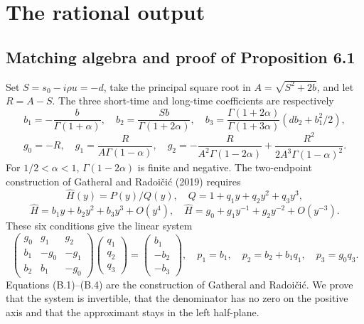 \documentclass[11pt,a4paper]{article}
\begin{document}
\setcounter{section}{1}\section{The rational output}

\setcounter{subsection}{0}\subsection{Matching algebra and proof of Proposition 6.1}

Set \(S=s_0-i\rho u=-d\), take the principal square root in \(A=\sqrt{S^2+2b}\), and let \(R=A-S\). The three short-time and long-time coefficients are respectively
\begin{equation*}\tag{B.1}
b_1=-\frac b{\Gamma(1+\alpha)},\quad
b_2=\frac{Sb}{\Gamma(1+2\alpha)},\quad
b_3=\frac{\Gamma(1+2\alpha)}{\Gamma(1+3\alpha)}
       (d b_2+b_1^2/2),
\end{equation*}
\begin{equation*}\tag{B.2}
g_0=-R,\quad g_1=\frac R{A\Gamma(1-\alpha)},\quad
g_2=-\frac R{A^2\Gamma(1-2\alpha)}
       +\frac{R^2}{2A^3\Gamma(1-\alpha)^2}.
\end{equation*}
For \(1/2<\alpha<1\), \(\Gamma(1-2\alpha)\) is finite and negative. The two-endpoint construction of Gatheral and Radoičić (2019) requires
\[
\widehat H(y)=P(y)/Q(y),\quad
Q=1+q_1y+q_2y^2+q_3y^3,
\]
\begin{equation*}\tag{B.3}
\widehat H=b_1y+b_2y^2+b_3y^3+O(y^4),\quad
\widehat H=g_0+g_1y^{-1}+g_2y^{-2}+O(y^{-3}).
\end{equation*}
These six conditions give the linear system
\begin{equation*}\tag{B.4}
\begin{pmatrix}g_0&g_1&g_2\\b_1&-g_0&-g_1\\
b_2&b_1&-g_0\end{pmatrix}
\begin{pmatrix}q_1\\q_2\\q_3\end{pmatrix}
=\begin{pmatrix}b_1\\-b_2\\-b_3\end{pmatrix},
\quad p_1=b_1,\quad p_2=b_2+b_1q_1,\quad p_3=g_0q_3.
\end{equation*}
Equations (B.1)–(B.4) are the construction of Gatheral and Radoičić. We prove that the system is invertible, that the denominator has no zero on the positive axis and that the approximant stays in the left half-plane.
\end{document}
